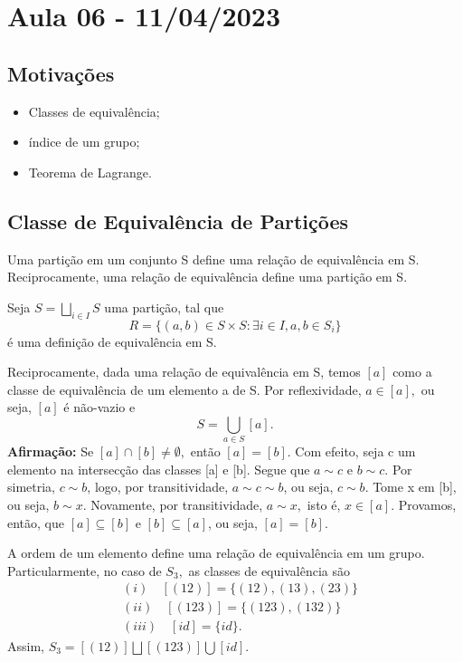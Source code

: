 \documentclass[Algebra/algebra_notes.tex]{subfiles}
\begin{document}
\section{Aula 06 - 11/04/2023}
\subsection{Motivações}
\begin{itemize}
	\item Classes de equivalência;
	\item índice de um grupo;
	\item Teorema de Lagrange.
\end{itemize}

\subsection{Classe de Equivalência de Partições}
\begin{theorem*}
	Uma partição em um conjunto S define uma relação de equivalência em S. Reciprocamente, uma relação de
	equivalência define uma partição em S.
\end{theorem*}
\begin{proof*}
	Seja $S = \bigsqcup_{i\in I}S$ uma partição, tal que
	$$
		R = \{(a,b)\in S\times S: \exists i\in I, a ,b\in S_{i}\}
	$$
	é uma definição de equivalência em S.

	Reciprocamente, dada uma relação de equivalência em S, temos $[a]$ como a classe de equivalência de um elemento a de S.
	Por reflexividade, $a\in[a],$ ou seja, $[a]$ é não-vazio e
	$$
		S = \bigcup_{a\in S}[a].
	$$
	\textbf{Afirmação:} Se $[a]\cap[b]\neq\emptyset,$ então $[a]=[b].$
	Com efeito, seja c um elemento na intersecção das classes [a] e [b]. Segue que $a\sim c$ e $b\sim c$. Por simetria,
	$c\sim b$, logo, por transitividade, $a\sim c\sim b$, ou seja, $c\sim b$. Tome x em [b], ou seja, $b\sim x.$ Novamente,
	por transitividade, $a\sim x,$ isto é, $x\in[a].$ Provamos, então, que $[a]\subseteq{[b]}$ e $[b]\subseteq{[a]}$, ou seja,
	$[a]=[b].$ \qedsymbol
\end{proof*}
\begin{example*}
	A ordem de um elemento define uma relação de equivalência em um grupo. Particularmente, no caso de $S_{3},$ as classes
	de equivalência são
	\begin{align*}
		 & (i)\quad [(12)]  = \{(12), (13), (23)\} \\
		 & (ii)\quad [(123)] = \{(123), (132)\}    \\
		 & (iii)\quad [id] = \{id\}.
	\end{align*}
	Assim, $S_{3}=[(12)]\bigsqcup{}[(123)]\bigcup{[id]}.$ \qedsymbol
\end{example*}
\end{document}
